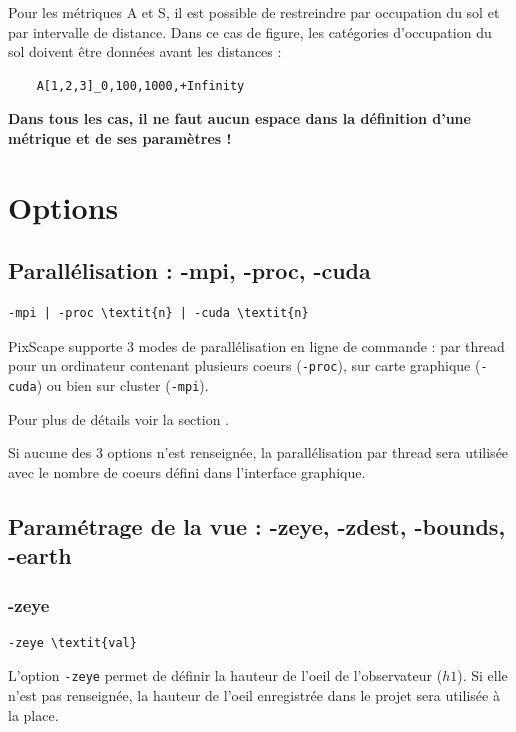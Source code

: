 \documentclass{report}
\begin{document}
Pour les métriques A et S, il est possible de restreindre par occupation du sol et par intervalle de distance. Dans ce cas de figure, les catégories d'occupation du sol doivent être données avant les distances :
\begin{Verbatim}
	A[1,2,3]_0,100,1000,+Infinity
\end{Verbatim}

\textbf{Dans tous les cas, il ne faut aucun espace dans la définition d'une métrique et de ses paramètres !}

\section{Options}

\subsection{Parallélisation : -mpi, -proc, -cuda}
\begin{Verbatim}[commandchars=\\\{\}]
-mpi | -proc \textit{n} | -cuda \textit{n}
\end{Verbatim}

PixScape supporte 3 modes de parallélisation en ligne de commande : par thread pour un ordinateur contenant plusieurs coeurs (\verb|-proc|), sur carte graphique (\verb|-cuda|) ou bien sur cluster (\verb|-mpi|).

Pour plus de détails voir la section .

Si aucune des 3 options n'est renseignée, la parallélisation par thread sera utilisée avec le nombre de coeurs défini dans l'interface graphique.

\subsection{Paramétrage de la vue : -zeye, -zdest, -bounds, -earth}

\subsubsection{-zeye}
\begin{Verbatim}[commandchars=\\\{\}]
-zeye \textit{val}
\end{Verbatim}
L'option \verb|-zeye| permet de définir la hauteur de l'oeil de l'observateur ($h1$). Si elle n'est pas renseignée, la hauteur de l'oeil enregistrée dans le projet sera utilisée à la place.
\end{document}
